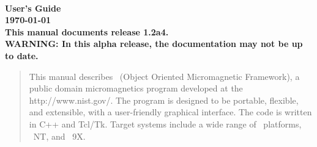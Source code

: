 
\usepackage{l2hbugs}




\nocite{*}  %


\begin{titlepage}
\label{page:contents}
\par
\vspace*{\fill}
\begin{center}
\Large\bf
\OOMMF\\
User's Guide\\[2ex]
\large
{\today}
{}\\[2ex]
This manual documents release 1.2a4.\\[1ex]
WARNING: In this alpha release, the
documentation may not be up to date.

\end{center}
\vspace{10\baselineskip}
\begin{abstract}
This manual describes \OOMMF\ (Object Oriented Micromagnetic Framework),
a public domain micromagnetics program developed at the
{http://www.nist.gov/}.  The program is designed
to be portable, flexible, and extensible, with a user-friendly graphical
interface.  The code is written in C++ and Tcl/Tk. Target systems
include a wide range of \Unix\ platforms, \Windows~NT, and
\Windows~9X.
\end{abstract}
\vspace*{\fill}
\par
\end{titlepage}

\begin{latexonly}
\tableofcontents
\end{latexonly}

